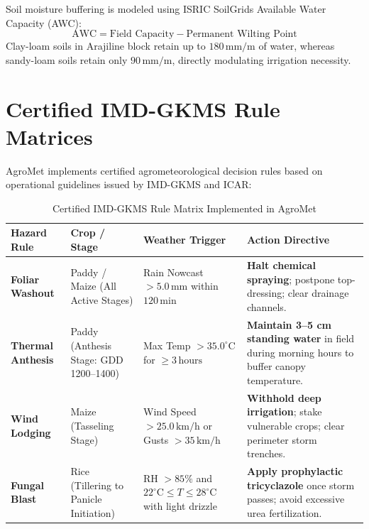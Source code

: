 \documentclass[11pt,a4paper,oneside]{report}
\begin{document}
Soil moisture buffering is modeled using ISRIC SoilGrids Available Water Capacity (AWC):
\begin{equation}
\text{AWC} = \text{Field Capacity} - \text{Permanent Wilting Point}
\end{equation}
Clay-loam soils in Arajiline block retain up to $180\,\text{mm/m}$ of water, whereas sandy-loam soils retain only $90\,\text{mm/m}$, directly modulating irrigation necessity.

\section{Certified IMD-GKMS Rule Matrices}
AgroMet implements certified agrometeorological decision rules based on operational guidelines issued by IMD-GKMS and ICAR:

\begin{table}[htbp]
\centering
\small
\caption{Certified IMD-GKMS Rule Matrix Implemented in AgroMet}
\label{tab:advisory_rules}
\begin{tabularx}{\textwidth}{l p{2.8cm} p{3.2cm} X}
\toprule
\textbf{Hazard Rule} & \textbf{Crop / Stage} & \textbf{Weather Trigger} & \textbf{Action Directive} \\
\midrule
\textbf{Foliar Washout} & Paddy / Maize (All Active Stages) & Rain Nowcast $> 5.0\,\text{mm}$ within $120\,\text{min}$ & \textbf{Halt chemical spraying}; postpone top-dressing; clear drainage channels. \\
\textbf{Thermal Anthesis} & Paddy (Anthesis Stage: GDD 1200--1400) & Max Temp $> 35.0^\circ\text{C}$ for $\ge 3\,\text{hours}$ & \textbf{Maintain 3--5 cm standing water} in field during morning hours to buffer canopy temperature. \\
\textbf{Wind Lodging} & Maize (Tasseling Stage) & Wind Speed $> 25.0\,\text{km/h}$ or Gusts $> 35\,\text{km/h}$ & \textbf{Withhold deep irrigation}; stake vulnerable crops; clear perimeter storm trenches. \\
\textbf{Fungal Blast} & Rice (Tillering to Panicle Initiation) & RH $> 85\%$ and $22^\circ\text{C} \le T \le 28^\circ\text{C}$ with light drizzle & \textbf{Apply prophylactic tricyclazole} once storm passes; avoid excessive urea fertilization. \\
\bottomrule
\end{tabularx}
\end{table}
\end{document}
